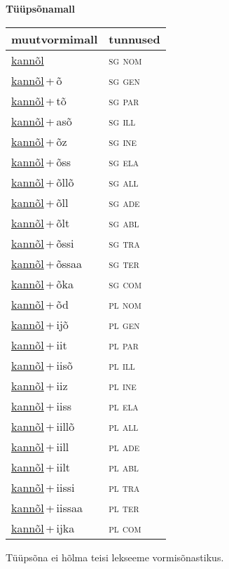 
\vspace{1.8em}
\begin{minipage}{\textwidth}
\textbf{Tüüpsõnamall \,}\\

\begin{sideways}
\begin{tabular}{l l}
muutvormimall & tunnused \\
\hline
\underline{kannõl} & \textsc{ sg nom } \\
\underline{kannõl}\,+\,õ & \textsc{ sg gen } \\
\underline{kannõl}\,+\,tõ & \textsc{ sg par } \\
\underline{kannõl}\,+\,asõ & \textsc{ sg ill } \\
\underline{kannõl}\,+\,õz & \textsc{ sg ine } \\
\underline{kannõl}\,+\,õss & \textsc{ sg ela } \\
\underline{kannõl}\,+\,õllõ & \textsc{ sg all } \\
\underline{kannõl}\,+\,õll & \textsc{ sg ade } \\
\underline{kannõl}\,+\,õlt & \textsc{ sg abl } \\
\underline{kannõl}\,+\,õssi & \textsc{ sg tra } \\
\underline{kannõl}\,+\,õssaa & \textsc{ sg ter } \\
\underline{kannõl}\,+\,õka & \textsc{ sg com } \\
\underline{kannõl}\,+\,õd & \textsc{ pl nom } \\
\underline{kannõl}\,+\,ijõ & \textsc{ pl gen } \\
\underline{kannõl}\,+\,iit & \textsc{ pl par } \\
\underline{kannõl}\,+\,iisõ & \textsc{ pl ill } \\
\underline{kannõl}\,+\,iiz & \textsc{ pl ine } \\
\underline{kannõl}\,+\,iiss & \textsc{ pl ela } \\
\underline{kannõl}\,+\,iillõ & \textsc{ pl all } \\
\underline{kannõl}\,+\,iill & \textsc{ pl ade } \\
\underline{kannõl}\,+\,iilt & \textsc{ pl abl } \\
\underline{kannõl}\,+\,iissi & \textsc{ pl tra } \\
\underline{kannõl}\,+\,iissaa & \textsc{ pl ter } \\
\underline{kannõl}\,+\,ijka & \textsc{ pl com } \\
\end{tabular}
\end{sideways}
\label{tab:tüüpsõnamall-kannõl}

\end{minipage}

 
\vspace{1em}
\noindent Tüüpsõna ei hõlma teisi lekseeme vormi\-sõnastikus.
